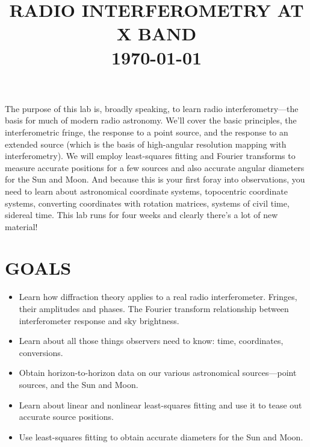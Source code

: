 \documentclass[11pt,preprint]{aastex}
\begin{document}
\def\simlt{\lower.5ex\hbox{$\; \buildrel < \over \sim \;$}}
\def\simgt{\lower.5ex\hbox{$\; \buildrel > \over \sim \;$}}


\title {RADIO INTERFEROMETRY AT X BAND \\ \today}

\tableofcontents

The purpose of this lab is, broadly speaking, to learn radio
interferometry---the basis for much of modern radio astronomy. We'll
cover the basic principles, the interferometric fringe, the response to
a point source, and the response to an extended source (which is the
basis of high-angular resolution mapping with interferometry). We will
employ least-squares fitting and Fourier transforms to measure accurate
positions for a few sources and also accurate angular diameters for the
Sun and Moon. And because this is your first foray into observations,
you need to learn about astronomical coordinate systems, topocentric
coordinate systems, converting coordinates with rotation matrices,
systems of civil time, sidereal time. This lab runs for four weeks and
clearly there's a lot of new material!

\section{GOALS}

\begin{itemize}

\item Learn how diffraction theory applies to a real radio
  interferometer. Fringes, their amplitudes and phases. The Fourier
  transform relationship between interferometer response and sky
  brightness. 

\item Learn about all those things observers need to know: time,
  coordinates, conversions.

\item Obtain horizon-to-horizon data on our various astronomical
  sources---point sources, and the Sun and Moon.

\item Learn about linear and nonlinear least-squares fitting and use it
  to tease out accurate source positions.

\item Use least-squares fitting to obtain accurate diameters for the Sun
  and Moon.

\end{itemize}
\end{document}
